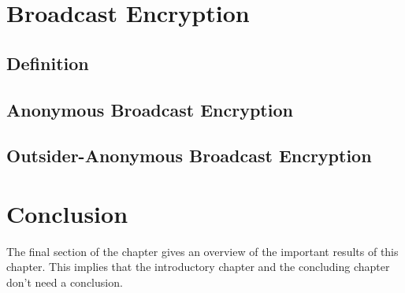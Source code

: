 \section{Broadcast Encryption}

\subsection{Definition}

\subsection{Anonymous Broadcast Encryption}

\subsection{Outsider-Anonymous Broadcast Encryption}

\section{Conclusion}
The final section of the chapter gives an overview of the important results of this chapter. This implies that the introductory chapter and the concluding chapter don't need a conclusion.

\lipsum[66]

